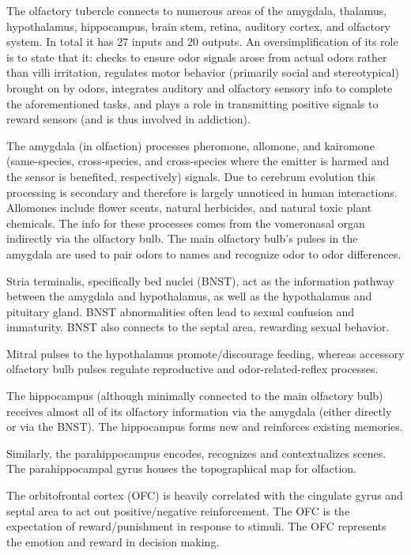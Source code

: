 The olfactory tubercle connects to numerous areas of the amygdala, thalamus, hypothalamus, hippocampus, brain stem, retina, auditory cortex, and olfactory system. In total it has 27 inputs and 20 outputs. An oversimplification of its role is to state that it: checks to ensure odor signals arose from actual odors rather than villi irritation, regulates motor behavior (primarily social and stereotypical) brought on by odors, integrates auditory and olfactory sensory info to complete the aforementioned tasks, and plays a role in transmitting positive signals to reward sensors (and is thus involved in addiction).

The amygdala (in olfaction) processes pheromone, allomone, and kairomone (same-species, cross-species, and cross-species where the emitter is harmed and the sensor is benefited, respectively) signals. Due to cerebrum evolution this processing is secondary and therefore is largely unnoticed in human interactions. Allomones include flower scents, natural herbicides, and natural toxic plant chemicals. The info for these processes comes from the vomeronasal organ indirectly via the olfactory bulb. The main olfactory bulb's pulses in the amygdala are used to pair odors to names and recognize odor to odor differences.

Stria terminalis, specifically bed nuclei (BNST), act as the information pathway between the amygdala and hypothalamus, as well as the hypothalamus and pituitary gland. BNST abnormalities often lead to sexual confusion and immaturity. BNST also connects to the septal area, rewarding sexual behavior.

Mitral pulses to the hypothalamus promote/discourage feeding, whereas accessory olfactory bulb pulses regulate reproductive and odor-related-reflex processes.

The hippocampus (although minimally connected to the main olfactory bulb) receives almost all of its olfactory information via the amygdala (either directly or via the BNST). The hippocampus forms new and reinforces existing memories.

Similarly, the parahippocampus encodes, recognizes and contextualizes scenes. The parahippocampal gyrus houses the topographical map for olfaction.

The orbitofrontal cortex (OFC) is heavily correlated with the cingulate gyrus and septal area to act out positive/negative reinforcement. The OFC is the expectation of reward/punishment in response to stimuli. The OFC represents the emotion and reward in decision making.

